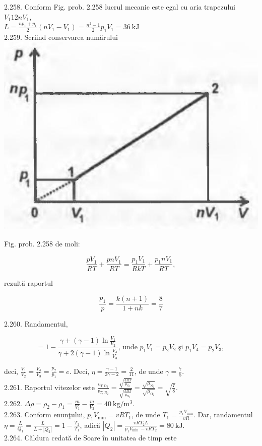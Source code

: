 \documentclass[10pt]{article}
\begin{document}
2.258. Conform Fig. prob. 2.258 lucrul mecanic este egal cu aria trapezului $V_{1} 12 n V_{1}$,\\
$L=\frac{n p_{1}+p_{1}}{2}\left(n V_{1}-V_{1}\right)=\frac{n^{2}-1}{2} p_{1} V_{1}=36 \mathrm{~kJ}$\\
2.259. Scriind conservarea numărului\\
\includegraphics[max width=\textwidth, center]{2025_07_01_5b3ff9fa0d508c8e9f17g-326}

Fig. prob. 2.258 de moli:

$$
\frac{p V_{1}}{R T}+\frac{p n V_{1}}{R T}=\frac{p_{1} V_{1}}{R k T}+\frac{p_{1} n V_{1}}{R T},
$$

rezultă raportul

$$
\frac{p_{1}}{p}=\frac{k(n+1)}{1+n k}=\frac{8}{7}
$$

2.260. Randamentul,

$$
=1-\frac{\gamma+(\gamma-1) \ln \frac{V_{1}}{V_{2}}}{\gamma+2(\gamma-1) \ln \frac{V_{4}}{V_{3}}} \text {, unde } p_{1} V_{1}=p_{2} V_{2} \text { şi } p_{1} V_{4}=p_{2} V_{3} \text {, }
$$

deci, $\frac{V_{1}}{V_{2}}=\frac{V_{4}}{V_{3}}=\frac{p_{2}}{p_{1}}=e$. Deci, $\eta=\frac{\gamma-1}{3 \gamma-2}=\frac{2}{11}$, de unde $\gamma=\frac{7}{5}$.\\
2.261. Raportul vitezelor este $\frac{v_{T, \mathrm{O}_{2}}}{v_{T, \mathrm{~N}_{2}}}=\frac{\sqrt{\frac{3 R T}{\mu_{\mathrm{O}_{2}}}}}{\sqrt{\frac{3 R T}{\mu_{\mathrm{N}_{2}}}}}=\frac{\sqrt{\mu_{\mathrm{N}_{2}}}}{\sqrt{\mu_{\mathrm{O}_{2}}}}=\sqrt{\frac{7}{8}}$.\\
2.262. $\Delta \rho=\rho_{2}-\rho_{1}=\frac{m}{V_{1}}-\frac{m}{V_{2}}=40 \mathrm{~kg} / \mathrm{m}^{3}$.\\
2.263. Conform enunţului, $p_{1} V_{\min }=v R T_{1}$, de unde $T_{1}=\frac{p_{1} V_{\min }}{v R}$. Dar, randamentul $\eta=\frac{L}{Q_{1}}=\frac{L}{L+\left|Q_{2}\right|}=1-\frac{T_{2}}{T_{1}}$, adică $\left|Q_{2}\right|=\frac{v R T_{2} L}{p_{1} V_{\text {min }}-v R T_{2}}=80 \mathrm{~kJ}$.\\
2.264. Căldura cedată de Soare în unitatea de timp este
\end{document}
